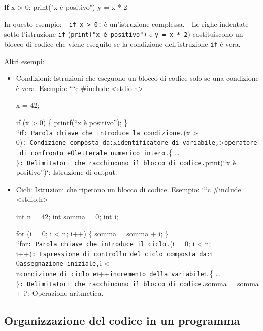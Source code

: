 \documentclass[
  letterpaper,
]{scrbook}
\newenvironment{Shaded}{\begin{snugshade}}{\end{snugshade}}
\newcommand{\BuiltInTok}[1]{\textcolor[rgb]{0.00,0.23,0.31}{#1}}
\newcommand{\ControlFlowTok}[1]{\textcolor[rgb]{0.00,0.23,0.31}{\textbf{#1}}}
\newcommand{\DecValTok}[1]{\textcolor[rgb]{0.68,0.00,0.00}{#1}}
\newcommand{\NormalTok}[1]{\textcolor[rgb]{0.00,0.23,0.31}{#1}}
\newcommand{\OperatorTok}[1]{\textcolor[rgb]{0.37,0.37,0.37}{#1}}
\newcommand{\StringTok}[1]{\textcolor[rgb]{0.13,0.47,0.30}{#1}}
\begin{document}
\begin{Shaded}
\begin{Highlighting}[]
  \ControlFlowTok{if}\NormalTok{ x }\OperatorTok{\textgreater{}} \DecValTok{0}\NormalTok{:}
      \BuiltInTok{print}\NormalTok{(}\StringTok{"x è positivo"}\NormalTok{)}
\NormalTok{      y }\OperatorTok{=}\NormalTok{ x }\OperatorTok{*} \DecValTok{2}
\end{Highlighting}
\end{Shaded}

In questo esempio: - \texttt{if\ x\ \textgreater{}\ 0:} è un'istruzione
complessa. - Le righe indentate sotto l'istruzione \texttt{if}
(\texttt{print("x\ è\ positivo")} e \texttt{y\ =\ x\ *\ 2})
costituiscono un blocco di codice che viene eseguito se la condizione
dell'istruzione \texttt{if} è vera.

Altri esempi:

\begin{itemize}
\item
  Condizioni: Istruzioni che eseguono un blocco di codice solo se una
  condizione è vera. Esempio: ```c \#include
  \textless stdio.h\textgreater{}

  x = 42;

  if (x \textgreater{} 0) \{ printf(``x è positivo\n''); \}
  ``\texttt{}if\texttt{:\ Parola\ chiave\ che\ introduce\ la\ condizione.}(x
  \textgreater{}
  0)\texttt{:\ Condizione\ composta\ da:}x\texttt{identificatore\ di\ variabile,}\textgreater{}\texttt{operatore\ di\ confronto\ e}0\texttt{letterale\ numerico\ intero.}\{
  \ldots{}
  \}\texttt{:\ Delimitatori\ che\ racchiudono\ il\ blocco\ di\ codice.}print(``x
  è positivo'')`: Istruzione di output.
\item
  Cicli: Istruzioni che ripetono un blocco di codice. Esempio: ```c
  \#include \textless stdio.h\textgreater{}

  int n = 42; int somma = 0; int i;

  for (i = 0; i \textless{} n; i++) \{ somma = somma + i; \}
  ``\texttt{}for\texttt{:\ Parola\ chiave\ che\ introduce\ il\ ciclo.}(i
  = 0; i \textless{} n;
  i++)\texttt{:\ Espressione\ di\ controllo\ del\ ciclo\ composta\ da:}i
  = 0\texttt{assegnazione\ iniziale,}i \textless{}
  n\texttt{condizione\ di\ ciclo\ e}i++\texttt{incremento\ della\ variabile}i\texttt{.}\{
  \ldots{}
  \}\texttt{:\ Delimitatori\ che\ racchiudono\ il\ blocco\ di\ codice.}somma
  = somma + i`: Operazione aritmetica.
\end{itemize}

\subsection{Organizzazione del codice in un
programma}\label{organizzazione-del-codice-in-un-programma}
\end{document}
